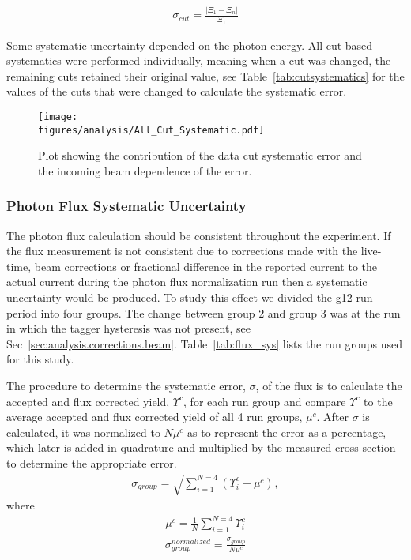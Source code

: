 \begin{align}
\sigma_{cut} = \frac{\left| \Xi_1 - \Xi_n \right|}{\Xi_1}
\end{align}

Some systematic uncertainty depended on the photon energy. All cut based systematics were performed individually, meaning when a cut was changed, the remaining cuts retained their original value, see Table~\ref{tab:cutsystematics} for the values of the cuts that were changed to calculate the systematic error.


\begin{figure}[h!]\begin{center}
\texttt{[image: \\figures/analysis/All\_Cut\_Systematic.pdf]}
\caption[Plot showing the contribution of the data cut systematic error and the incoming beam dependence of the error]{\label{fig:sys_cut_error} Plot showing the contribution of the data cut systematic error and the incoming beam dependence of the error.}
\end{center}\end{figure}
\FloatBarrier
\subsubsection{Photon Flux Systematic Uncertainty}
The photon flux calculation should be consistent throughout the experiment. If the flux measurement is not consistent due to corrections made with the live-time, beam corrections or fractional difference in the reported current to the actual current during the photon flux normalization run then a systematic uncertainty would be produced. To study this effect we divided the g12 run period into four groups. The change between group 2 and group 3 was at the run in which the tagger hysteresis was not present, see Sec~\ref{sec:analysis.corrections.beam}. Table~\ref{tab:flux_sys} lists the run groups used for this study.


The procedure to determine the systematic error, $\sigma$, of the flux is to calculate the accepted and flux corrected yield, $\Upsilon^c$, for each run group and compare $\Upsilon^c$ to the average accepted and flux corrected yield of all 4 run groups, $\mu^c$. After $\sigma$ is calculated, it was normalized to $N \mu^c$ as to represent the error as a percentage, which later is added in quadrature and  multiplied by the measured cross section to determine the appropriate error. 
\begin{align}
\sigma_{group} = \sqrt{\sum_{i=1}^{N = 4}\left(\Upsilon_i^c - \mu^c\right)},
\end{align}
where
\begin{align}
\mu^c = \frac{1}{N}\sum_{i=1}^{N=4}\Upsilon_i^c
\end{align}
\begin{align}
\sigma_{group}^{normalized} = \frac{\sigma_{group}}{N\mu^c}
\end{align}

